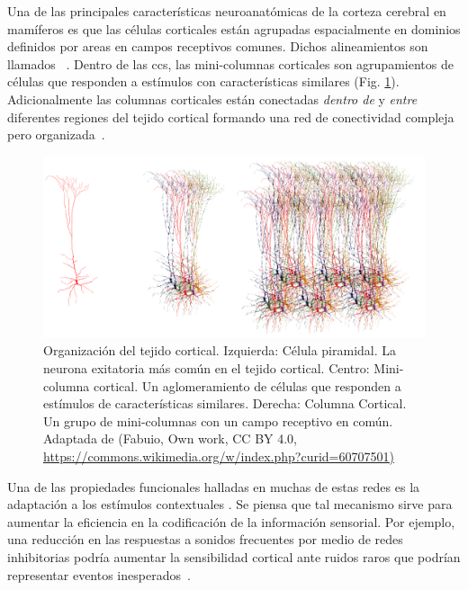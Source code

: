 {Una de las principales características neuroanatómicas de la corteza cerebral en mamíferos es que las células corticales están agrupadas espacialmente en dominios definidos por areas en campos receptivos comunes. Dichos alineamientos son llamados ~\cite{mountcastle_1955, mountcastle_1957, hubel_1962, hubel_1968}. Dentro de las \glspl{cc}, las mini-columnas corticales son agrupamientos de células que responden a estímulos con características similares (Fig. \ref{fig:Biological}). Adicionalmente las columnas corticales están conectadas \emph{dentro de} y \emph{entre} diferentes regiones del tejido cortical formando una red de conectividad compleja pero organizada~\cite{mountcastle_1997}.

\begin{figure}[h!]
    \centering
    \includegraphics[width=1.0\textwidth]{Biological.png}
    \caption{Organización del tejido cortical. Izquierda: Célula piramidal. La neurona exitatoria más común en el tejido cortical.
	    Centro: Mini-columna cortical. Un aglomeramiento de células que responden a estímulos de características similares.
	    Derecha: Columna Cortical. Un grupo de mini-columnas con un campo receptivo en común.
	    Adaptada de (Fabuio, Own work, CC BY 4.0, \url{https://commons.wikimedia.org/w/index.php?curid=60707501)}}
    \label{fig:Biological}
\end{figure}

Una de las propiedades funcionales halladas en muchas de estas redes es la adaptación a los estímulos contextuales \cite{KRAUSE201436,doi:10.1167/16.13.1}. Se piensa que tal mecanismo sirve para aumentar la eficiencia en la codificación de la información sensorial. Por ejemplo, una reducción en las respuestas a sonidos frecuentes por medio de redes inhibitorias podría aumentar la sensibilidad cortical ante ruidos raros que podrían representar eventos inesperados~\cite{Natan2015ComplementaryCO,nachum_2003,Javitt11962}.

}
